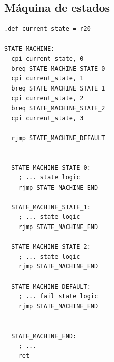 \subsection{Máquina de estados}\label{anexo:Maquina_de_Estados}
\begin{verbatim}
.def current_state = r20

STATE_MACHINE:
  cpi current_state, 0
  breq STATE_MACHINE_STATE_0
  cpi current_state, 1
  breq STATE_MACHINE_STATE_1
  cpi current_state, 2
  breq STATE_MACHINE_STATE_2
  cpi current_state, 3

  rjmp STATE_MACHINE_DEFAULT
  

  STATE_MACHINE_STATE_0:
    ; ... state logic
    rjmp STATE_MACHINE_END

  STATE_MACHINE_STATE_1:
    ; ... state logic
    rjmp STATE_MACHINE_END

  STATE_MACHINE_STATE_2:
    ; ... state logic
    rjmp STATE_MACHINE_END

  STATE_MACHINE_DEFAULT:
    ; ... fail state logic
    rjmp STATE_MACHINE_END

  
  STATE_MACHINE_END:
    ; ...
    ret
\end{verbatim}
